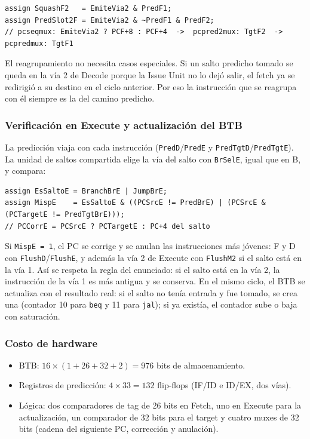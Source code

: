 \documentclass[11pt,a4paper]{article}
\newcommand{\sig}[1]{\texttt{#1}}
\begin{document}
\begin{lstlisting}
assign SquashF2   = EmiteVia2 & PredF1;
assign PredSlot2F = EmiteVia2 & ~PredF1 & PredF2;
// pcseqmux: EmiteVia2 ? PCF+8 : PCF+4  ->  pcpred2mux: TgtF2  ->  pcpredmux: TgtF1
\end{lstlisting}

El reagrupamiento no necesita casos especiales. Si un salto predicho tomado se queda en la vía 2 de Decode porque la Issue Unit no lo dejó salir, el fetch ya se redirigió a su destino en el ciclo anterior. Por eso la instrucción que se reagrupa con él siempre es la del camino predicho.

\subsubsection{Verificación en Execute y actualización del BTB}

La predicción viaja con cada instrucción (\sig{PredD}/\sig{PredE} y \sig{PredTgtD}/\sig{PredTgtE}). La unidad de saltos compartida elige la vía del salto con \sig{BrSelE}, igual que en B, y compara:

\begin{lstlisting}
assign EsSaltoE = BranchBrE | JumpBrE;
assign MispE    = EsSaltoE & ((PCSrcE != PredBrE) | (PCSrcE & (PCTargetE != PredTgtBrE)));
// PCCorrE = PCSrcE ? PCTargetE : PC+4 del salto
\end{lstlisting}

Si \sig{MispE~=~1}, el PC se corrige y se anulan las instrucciones más jóvenes: F y D con \sig{FlushD}/\sig{FlushE}, y además la vía 2 de Execute con \sig{FlushM2} si el salto está en la vía 1. Así se respeta la regla del enunciado: si el salto está en la vía 2, la instrucción de la vía 1 es más antigua y se conserva. En el mismo ciclo, el BTB se actualiza con el resultado real: si el salto no tenía entrada y fue tomado, se crea una (contador 10 para \sig{beq} y 11 para \sig{jal}); si ya existía, el contador sube o baja con saturación.

\subsubsection{Costo de hardware}

\begin{itemize}[nosep]
  \item BTB: $16 \times (1 + 26 + 32 + 2) = 976$ bits de almacenamiento.
  \item Registros de predicción: $4 \times 33 = 132$ flip-flops (IF/ID e ID/EX, dos vías).
  \item Lógica: dos comparadores de tag de 26 bits en Fetch, uno en Execute para la actualización, un comparador de 32 bits para el target y cuatro muxes de 32 bits (cadena del siguiente PC, corrección y anulación).
\end{itemize}
\end{document}

